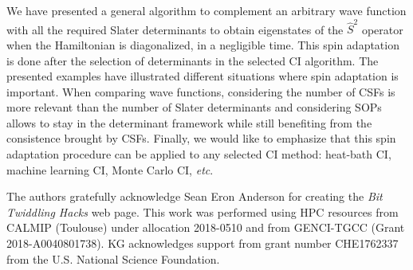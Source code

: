 \documentclass[aip,jcp,reprint,showkeys]{revtex4-1}
\newcommand{\stwo}{\hat{S}^2}
\newcommand{\sop}{SOP}
\newcommand{\csf}{CSF}
\begin{document}
We have presented a general algorithm to complement an arbitrary wave function
with all the required Slater determinants to obtain eigenstates of the $\stwo$
operator when the Hamiltonian is diagonalized, in a negligible time.  This
spin adaptation is done after the selection of determinants in the selected CI
algorithm.
The presented examples have illustrated different situations where
spin adaptation is important.  When comparing wave functions, considering the
number of \csf s is more relevant than the number of Slater determinants and
considering \sop s allows to stay in the determinant framework while still
benefiting from the consistence brought by \csf s.
Finally, we would like to emphasize that this spin adaptation procedure can be
applied to any selected CI method: heat-bath CI, machine learning CI, Monte
Carlo CI, \textit{etc}.


\begin{acknowledgments}
The authors gratefully acknowledge Sean Eron Anderson for creating the 
\emph{Bit Twiddling Hacks} web page.
This work was performed using HPC resources from CALMIP (Toulouse) under
allocation 2018-0510 and from GENCI-TGCC (Grant 2018-A0040801738).
KG acknowledges support from grant number CHE1762337 from the U.S. National Science Foundation.
\end{acknowledgments}



\end{document}
